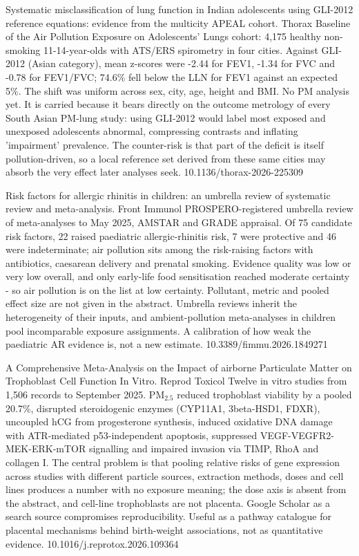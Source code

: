 \documentclass[10pt]{article}
\begin{document}
{Systematic misclassification of lung function in Indian adolescents using GLI-2012 reference equations: evidence from the multicity APEAL cohort.}
{Thorax}
{Baseline of the Air Pollution Exposure on Adolescents' Lungs cohort: 4,175 healthy non-smoking 11-14-year-olds with ATS/ERS spirometry in four cities. Against GLI-2012 (Asian category), mean z-scores were -2.44 for FEV1, -1.34 for FVC and -0.78 for FEV1/FVC; 74.6\% fell below the LLN for FEV1 against an expected 5\%. The shift was uniform across sex, city, age, height and BMI. No PM analysis yet. It is carried because it bears directly on the outcome metrology of every South Asian PM-lung study: using GLI-2012 would label most exposed and unexposed adolescents abnormal, compressing contrasts and inflating 'impairment' prevalence. The counter-risk is that part of the deficit is itself pollution-driven, so a local reference set derived from these same cities may absorb the very effect later analyses seek.}
{10.1136/thorax-2026-225309}

{Risk factors for allergic rhinitis in children: an umbrella review of systematic review and meta-analysis.}
{Front Immunol}
{PROSPERO-registered umbrella review of meta-analyses to May 2025, AMSTAR and GRADE appraisal. Of 75 candidate risk factors, 22 raised paediatric allergic-rhinitis risk, 7 were protective and 46 were indeterminate; air pollution sits among the risk-raising factors with antibiotics, caesarean delivery and prenatal smoking. Evidence quality was low or very low overall, and only early-life food sensitisation reached moderate certainty - so air pollution is on the list at low certainty. Pollutant, metric and pooled effect size are not given in the abstract. Umbrella reviews inherit the heterogeneity of their inputs, and ambient-pollution meta-analyses in children pool incomparable exposure assignments. A calibration of how weak the paediatric AR evidence is, not a new estimate.}
{10.3389/fimmu.2026.1849271}


{A Comprehensive Meta-Analysis on the Impact of airborne Particulate Matter on Trophoblast Cell Function In Vitro.}
{Reprod Toxicol}
{Twelve in vitro studies from 1,506 records to September 2025. PM$_{2.5}$ reduced trophoblast viability by a pooled 20.7\%, disrupted steroidogenic enzymes (CYP11A1, 3beta-HSD1, FDXR), uncoupled hCG from progesterone synthesis, induced oxidative DNA damage with ATR-mediated p53-independent apoptosis, suppressed VEGF-VEGFR2-MEK-ERK-mTOR signalling and impaired invasion via TIMP, RhoA and collagen I. The central problem is that pooling relative risks of gene expression across studies with different particle sources, extraction methods, doses and cell lines produces a number with no exposure meaning; the dose axis is absent from the abstract, and cell-line trophoblasts are not placenta. Google Scholar as a search source compromises reproducibility. Useful as a pathway catalogue for placental mechanisms behind birth-weight associations, not as quantitative evidence.}
{10.1016/j.reprotox.2026.109364}
\end{document}
